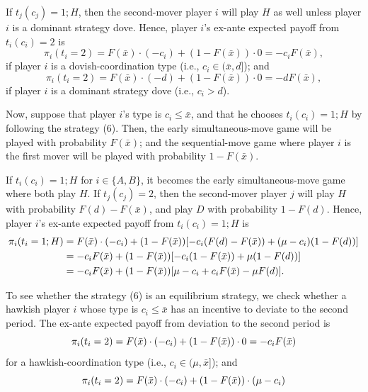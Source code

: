 \documentclass[12pt,english]{article}
\begin{document}
If $t_j(c_j)=1; H$, then the second-mover player $i$ will play $H$ as well unless player $i$ is a dominant strategy dove. Hence, player $i$'s ex-ante expected payoff from $t_i(c_i)=2$ is
\begin{equation}
\pi_i(t_i=2)=F(\bar{x})\cdot (-c_i)+(1-F(\bar{x})) \cdot 0=-c_iF(\bar{x}),
\end{equation}
if player $i$ is a dovish-coordination type (i.e., $c_i \in (\bar{x},d$]); and
\begin{equation}
\pi_i(t_i=2)=F(\bar{x})\cdot (-d)+(1-F(\bar{x})) \cdot 0=-dF(\bar{x}),
\end{equation}
if player $i$ is a dominant strategy dove (i.e., $c_i > d$).\par
Now, suppose that player $i$'s type is $c_i \leq \bar{x}$, and that he chooses $t_i(c_i)=1; H$ by following the strategy (6). Then, the early simultaneous-move game will be played with probability $F(\bar{x})$; and the sequential-move game where player $i$ is the first mover will be played with probability $1-F(\bar{x})$. \par 
If $t_i(c_i)=1; H$ for $i \in \{A,B\}$, it becomes the early simultaneous-move game where both play $H$. If $t_j(c_j)=2$, then the second-mover player $j$ will play $H$ with probability $F(d)-F(\bar{x})$, and play $D$ with probability $1-F(d)$. Hence, player $i$'s ex-ante expected payoff from $t_i(c_i)=1; H$ is
\begin{align}
\pi_i(t_i=1; H)&=F(\bar{x})\cdot (-c_i)+(1-F(\bar{x})) [-c_i (F(d)-F(\bar{x})) +(\mu-c_i)(1-F(d))]\\
&=-c_iF(\bar{x})+(1-F(\bar{x}))[-c_i(1-F(\bar{x}))+\mu(1-F(d))] \notag \\
&=-c_iF(\bar{x})+(1-F(\bar{x}))[\mu-c_i+c_iF(\bar{x})-\mu F(d)]. \notag
\end{align}\par
To see whether the strategy (6) is an equilibrium strategy, we check whether a hawkish player $i$ whose type is $c_i \leq \bar{x}$ has an incentive to deviate to the second period. The ex-ante expected payoff from deviation to the second period is
\begin{equation}
\pi_i(t_i=2)=F(\bar{x}) \cdot (-c_i) +(1-F(\bar{x})) \cdot 0=-c_iF(\bar{x}) \notag
\end{equation}
for a hawkish-coordination type (i.e., $ c_i \in (\mu, \bar{x}$]); and
\begin{equation}
\pi_i(t_i=2)=F(\bar{x}) \cdot (-c_i) +(1-F(\bar{x})) \cdot (\mu-c_i) \notag
\end{equation}
\end{document}
